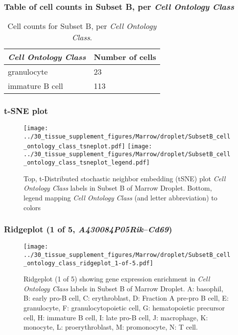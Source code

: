 \subsubsection{Table of cell counts in Subset B, per \emph{Cell Ontology Class}}\begin{table}[h]
\centering
\label{my-label}
\begin{tabular}{@{}ll@{}}
\toprule

\emph{Cell Ontology Class}& Number of cells \\ \midrule
granulocyte & 23 \\

immature B cell & 113 \\
\bottomrule
\end{tabular}
\caption{Cell counts for Subset B, per \emph{Cell Ontology Class}.}
\end{table}

\clearpage
\subsubsection{t-SNE plot}
\begin{figure}[h]
\centering
\texttt{[image: ../30\_tissue\_supplement\_figures/Marrow/droplet/SubsetB\_cell\_ontology\_class\_tsneplot.pdf]}
\texttt{[image: ../30\_tissue\_supplement\_figures/Marrow/droplet/SubsetB\_cell\_ontology\_class\_tsneplot\_legend.pdf]}
\caption{Top, t-Distributed stochastic neighbor embedding (tSNE) plot  \emph{Cell Ontology Class} labels in Subset B of Marrow Droplet. Bottom, legend mapping \emph{Cell Ontology Class} (and letter abbreviation) to colors}
\end{figure}


\clearpage

\subsubsection{Ridgeplot (1 of 5, \emph{A430084P05Rik}--\emph{Cd69})}
\begin{figure}[h]
\centering
\texttt{[image: ../30\_tissue\_supplement\_figures/Marrow/droplet/SubsetB\_cell\_ontology\_class\_ridgeplot\_1-of-5.pdf]}

\caption{ Ridgeplot (1 of 5)  showing gene expression enrichment in \emph{Cell Ontology Class} labels in Subset B of Marrow Droplet. A: basophil, B: early pro-B cell, C: erythroblast, D: Fraction A pre-pro B cell, E: granulocyte, F: granulocytopoietic cell, G: hematopoietic precursor cell, H: immature B cell, I: late pro-B cell, J: macrophage, K: monocyte, L: proerythroblast, M: promonocyte, N: T cell.}
\end{figure}


